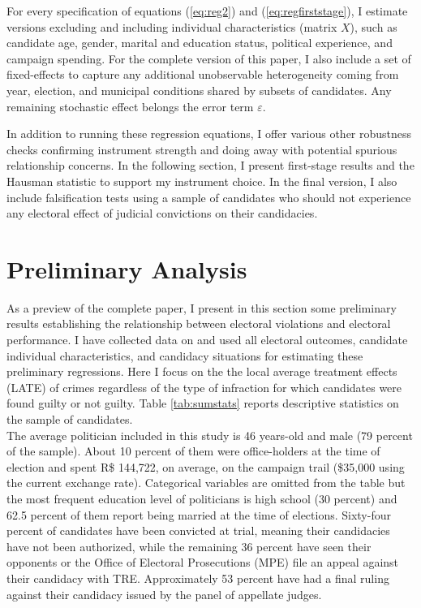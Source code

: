 \documentclass[11pt]{article}
\newcommand{\refp}[1]{(\ref{#1})}
\begin{document}
For every specification of equations \refp{eq:reg2} and \refp{eq:regfirststage}, I estimate versions excluding and including individual characteristics (matrix $X$), such as candidate age, gender, marital and education status, political experience, and campaign spending. For the complete version of this paper, I also include a set of fixed-effects to capture any additional unobservable heterogeneity coming from year, election, and municipal conditions shared by subsets of candidates. Any remaining stochastic effect belongs the error term $\varepsilon$.

In addition to running these regression equations, I offer various other robustness checks confirming instrument strength and doing away with potential spurious relationship concerns. In the following section, I present first-stage results and the Hausman statistic to support my instrument choice. In the final version, I also include falsification tests using a sample of candidates who should not experience any electoral effect of judicial convictions on their candidacies.

\section{Preliminary Analysis} \label{sec:results_paper1}

As a preview of the complete paper, I present in this section some preliminary results establishing the relationship between electoral violations and electoral performance. I have collected data on and used all electoral outcomes, candidate individual characteristics, and candidacy situations for estimating these preliminary regressions. Here I focus on the the local average treatment effects (LATE) of crimes regardless of the type of infraction for which candidates were found guilty or not guilty. Table \ref{tab:sumstats} reports descriptive statistics on the sample of candidates. \\



The average politician included in this study is 46 years-old and male (79 percent of the sample). About 10 percent of them were office-holders at the time of election and spent R\$ 144,722, on average, on the campaign trail (\$35,000 using the current exchange rate). Categorical variables are omitted from the table but the most frequent education level of politicians is high school (30 percent) and 62.5 percent of them report being married at the time of elections. Sixty-four percent of candidates have been convicted at trial, meaning their candidacies have not been authorized, while the remaining 36 percent have seen their opponents or the Office of Electoral Prosecutions (MPE) file an appeal against their candidacy with TRE. Approximately 53 percent have had a final ruling against their candidacy issued by the panel of appellate judges. \\
\end{document}
